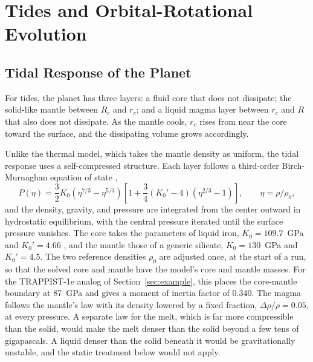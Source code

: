\documentclass[11pt]{article}
\begin{document}
\section{Tides and Orbital-Rotational Evolution}\label{sec:tides}

\subsection{Tidal Response of the Planet}

For tides, the planet has three layers: a fluid core that does not dissipate; the solid-like mantle between $R_c$ and $r_c$; and a liquid magma layer between $r_c$ and $R$ that also does not dissipate. As the mantle cools, $r_c$ rises from near the core toward the surface, and the dissipating volume grows accordingly.

Unlike the thermal model, which takes the mantle density as uniform, the tidal response uses a self-compressed structure. Each layer follows a third-order Birch-Murnaghan equation of state \citep{Birch1947},
\begin{equation}
P(\eta) = \frac{3}{2} K_0 \left( \eta^{7/3} - \eta^{5/3} \right) \left[ 1 + \frac{3}{4} \left( K_0' - 4 \right) \left( \eta^{2/3} - 1 \right) \right], \qquad \eta = \rho / \rho_0,
\end{equation}
and the density, gravity, and pressure are integrated from the center outward in hydrostatic equilibrium, with the central pressure iterated until the surface pressure vanishes. The core takes the parameters of liquid iron, $K_0 = 109.7$~GPa and $K_0' = 4.66$ \citep{Anderson1994}, and the mantle those of a generic silicate, $K_0 = 130$~GPa and $K_0' = 4.5$. The two reference densities $\rho_0$ are adjusted once, at the start of a run, so that the solved core and mantle have the model's core and mantle masses. For the TRAPPIST-1e analog of Section~\ref{sec:example}, this places the core-mantle boundary at 87~GPa and gives a moment of inertia factor of 0.340. The magma follows the mantle's law with its density lowered by a fixed fraction, $\Delta\rho / \rho = 0.05$, at every pressure. A separate law for the melt, which is far more compressible than the solid, would make the melt denser than the solid beyond a few tens of gigapascals. A liquid denser than the solid beneath it would be gravitationally unstable, and the static treatment below would not apply.
\end{document}
